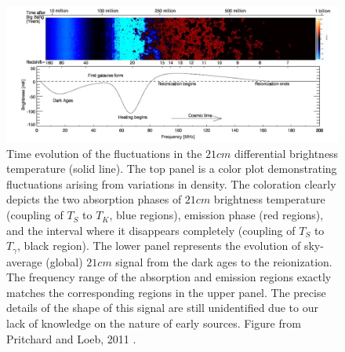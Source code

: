 \documentclass[12pt, TexShade, letterpaper]{report}
\begin{document}
\begin{figure}[h!]

\centering
\includegraphics[scale =0.8]{global_signal_pritchard_loeb.jpg}
\caption[Time evolution of the fluctuations in the $21cm$ differential brightness temperature]{Time evolution of the fluctuations in the $21cm$ differential brightness temperature (solid line). The top panel is a color plot demonstrating fluctuations arising from variations in density. The coloration clearly depicts the two absorption phases of $21cm$ brightness temperature (coupling of $T_S$ to $T_K$, blue regions), emission phase (red regions), and the interval where it disappears completely (coupling of $T_S$ to $T_\gamma$, black region). The lower panel represents the evolution of sky-average (global) $21cm$ signal from the dark ages to the reionization. The frequency range of the absorption and emission regions exactly matches the corresponding regions in the upper panel. The precise details of the shape of this signal are still unidentified due to our lack of knowledge on the nature of early sources\cite{liu2013global}. Figure from Pritchard and Loeb, 2011 \cite{21century}.}
\label{fig:global_signal_pritchard_loeb}
\end{figure}
\end{document}
